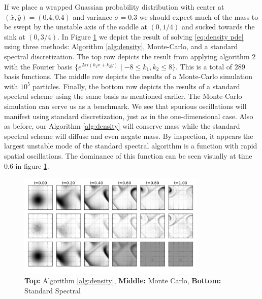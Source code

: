 \documentclass[final,leqno]{siamltex1213}
\begin{document}
If we place a wrapped Guassian probability distribution with center at $(\bar{x},\bar{y}) = (0.4,0.4)$ and variance $\sigma = 0.3$ we should expect much of the mass to be swept by the unstable
axis of the saddle at $(0,1/4)$ and sucked towards the sink at $(0,3/4)$.
In Figure \ref{fig:2 torus} we depict the result of solving \eqref{eq:density pde} using three methods: Algorithm \ref{alg:density}, Monte-Carlo, and a standard spectral discretization.
The top row depicts the result from applying algorithm 2 with the Fourier basis $\{ e^{2\pi i (k_{1}x +k_{2}y)} \mid -8 \leq k_{1},k_{2} \leq 8\}$.
This is a total of $289$ basis functions. 
The middle row depicts the results of a Monte-Carlo simulation with $10^{5}$ particles.
Finally, the bottom row depicts the results of a standard spectral scheme using the same basis as mentioned earlier.
The Monte-Carlo simulation can serve us as a benchmark.
We see that spurious oscillations will manifest using standard discretization, just as in the one-dimensional case.
Also as before, our Algorithm \ref{alg:density} will conserve mass while the standard spectral scheme will diffuse and even negate mass.
By inspection, it appears the largest unstable mode of the standard spectral algorithm is a function with rapid spatial oscillations.
The dominance of this function can be seen visually at time $0.6$ in figure \ref{fig:2 torus}.

\begin{figure}[h!]
	\centering
	\includegraphics[width=0.8\textwidth]{./images/two_torus.png}
	\caption{ \tiny {\bf Top:} Algorithm \ref{alg:density}, {\bf Middle:} Monte Carlo, {\bf Bottom:} Standard Spectral}
	\label{fig:2 torus}
\end{figure}
\end{document}
